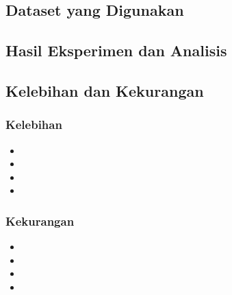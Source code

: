 \documentclass[10pt,a4paper]{article}
\begin{document}
\subsection{Dataset yang Digunakan}


\subsection{Hasil Eksperimen dan Analisis}


\subsection{Kelebihan dan Kekurangan}

\subsubsection{Kelebihan}
\begin{itemize}
    \item %
    \item %
    \item %
    \item %
\end{itemize}

\subsubsection{Kekurangan}
\begin{itemize}
    \item %
    \item %
    \item %
    \item %
\end{itemize}
\end{document}
